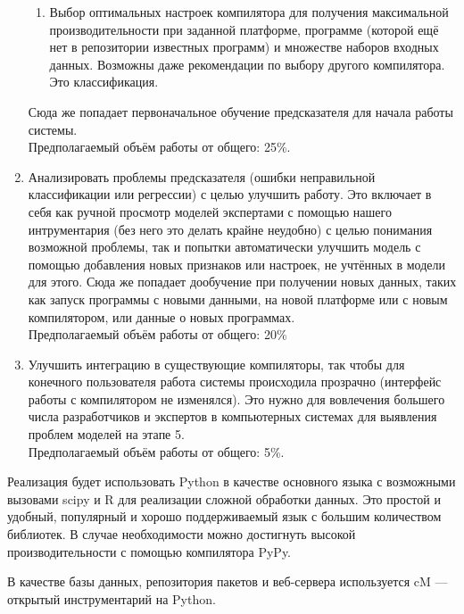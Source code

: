 \begin{enumerate}
{\begin{enumerate}
	\item Выбор оптимальных настроек компилятора для получения максимальной производительности при заданной платформе, программе (которой ещё нет в репозитории известных программ) и множестве наборов входных данных. Возможны даже рекомендации по выбору другого компилятора. Это классификация.
	\end{enumerate}
Сюда же попадает первоначальное обучение предсказателя для начала работы системы.\\
Предполагаемый объём работы от общего: 25\%.}
\item {Анализировать проблемы предсказателя (ошибки неправильной классификации или регрессии) с целью улучшить работу.
Это включает в себя как ручной просмотр моделей экспертами с помощью нашего интрументария (без него это делать крайне неудобно) с целью понимания возможной проблемы, так и попытки автоматически улучшить модель с помощью добавления новых признаков или настроек, не учтённых в модели для этого.
Сюда же попадает дообучение при получении новых данных, таких как запуск программы с новыми данными, на новой платформе или с новым компилятором, или данные о новых программах.\\
Предполагаемый объём работы от общего: 20\%}
\item {Улучшить интеграцию в существующие компиляторы, так чтобы для конечного пользователя работа системы происходила прозрачно (интерфейс работы с компилятором не изменялся). Это нужно для вовлечения большего числа разработчиков и экспертов в компьютерных системах для выявления проблем моделей на этапе 5.\\
Предполагаемый объём работы от общего: 5\%.}
\end{enumerate}

Реализация будет использовать Python в качестве основного языка с возможными вызовами scipy и R для реализации сложной обработки данных. Это простой и удобный, популярный и хорошо поддерживаемый язык с большим количеством библиотек. В случае необходимости можно достигнуть высокой производительности с помощью компилятора PyPy.

В качестве базы данных, репозитория пакетов и веб-сервера используется cM — открытый инструментарий на Python.